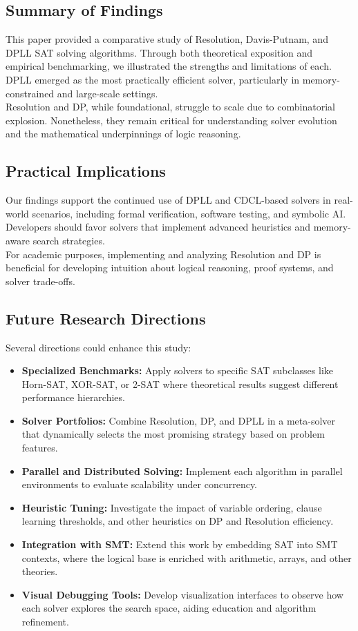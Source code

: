 \documentclass[11pt]{article}
\begin{document}
\subsection{Summary of Findings}
\hspace*{2em}
This paper provided a comparative study of Resolution, Davis-Putnam, and DPLL SAT solving algorithms. Through both theoretical exposition and empirical benchmarking, we illustrated the strengths and limitations of each. DPLL emerged as the most practically efficient solver, particularly in memory-constrained and large-scale settings.\\
\hspace*{2em}
Resolution and DP, while foundational, struggle to scale due to combinatorial explosion. Nonetheless, they remain critical for understanding solver evolution and the mathematical underpinnings of logic reasoning.

\subsection{Practical Implications}
\hspace*{2em}
Our findings support the continued use of DPLL and CDCL-based solvers in real-world scenarios, including formal verification, software testing, and symbolic AI. Developers should favor solvers that implement advanced heuristics and memory-aware search strategies.\\
\hspace*{2em}
For academic purposes, implementing and analyzing Resolution and DP is beneficial for developing intuition about logical reasoning, proof systems, and solver trade-offs.

\subsection{Future Research Directions}
Several directions could enhance this study:
\begin{itemize}
  \item \textbf{Specialized Benchmarks:} Apply solvers to specific SAT subclasses like Horn-SAT, XOR-SAT, or 2-SAT where theoretical results suggest different performance hierarchies.
  \item \textbf{Solver Portfolios:} Combine Resolution, DP, and DPLL in a meta-solver that dynamically selects the most promising strategy based on problem features.
  \item \textbf{Parallel and Distributed Solving:} Implement each algorithm in parallel environments to evaluate scalability under concurrency.
  \item \textbf{Heuristic Tuning:} Investigate the impact of variable ordering, clause learning thresholds, and other heuristics on DP and Resolution efficiency.
  \item \textbf{Integration with SMT:} Extend this work by embedding SAT into SMT contexts, where the logical base is enriched with arithmetic, arrays, and other theories.
  \item \textbf{Visual Debugging Tools:} Develop visualization interfaces to observe how each solver explores the search space, aiding education and algorithm refinement.
\end{itemize}
\end{document}
